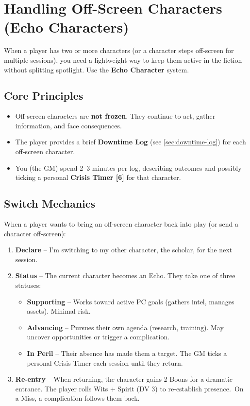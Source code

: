 \section{Handling Off-Screen Characters (Echo Characters)}
\label{sec:off-screen-characters}

When a player has two or more characters (or a character steps off-screen for multiple sessions), you need a lightweight way to keep them active in the fiction without splitting spotlight. Use the \textbf{Echo Character} system.

\subsection{Core Principles}
\begin{itemize}
\item Off-screen characters are \textbf{not frozen}. They continue to act, gather information, and face consequences.
\item The player provides a brief \textbf{Downtime Log} (see \ref{sec:downtime-log}) for each off-screen character.
\item You (the GM) spend 2--3 minutes per log, describing outcomes and possibly ticking a personal \textbf{Crisis Timer [6]} for that character.
\end{itemize}

\subsection{Switch Mechanics}
\label{subsec:switch-mechanics}
When a player wants to bring an off-screen character back into play (or send a character off-screen):
\begin{enumerate}
\item \textbf{Declare} -- \textquotedbl I'm switching to my other character, the scholar, for the next session.\textquotedbl
\item \textbf{Status} -- The current character becomes an Echo. They take one of three statuses:
  \begin{itemize}
    \item \textbf{Supporting} -- Works toward active PC goals (gathers intel, manages assets). Minimal risk.
    \item \textbf{Advancing} -- Pursues their own agenda (research, training). May uncover opportunities or trigger a complication.
    \item \textbf{In Peril} -- Their absence has made them a target. The GM ticks a personal Crisis Timer each session until they return.
  \end{itemize}
\item \textbf{Re-entry} -- When returning, the character gains 2 Boons for a dramatic entrance. The player rolls Wits + Spirit (DV 3) to \textquotedbl re-establish presence.\textquotedbl\ On a Miss, a complication follows them back.
\end{enumerate}

